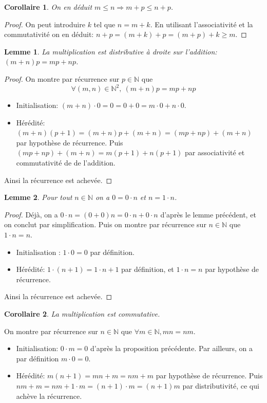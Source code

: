 \documentclass[french]{book}
\theoremstyle{plain}
\newtheorem{lem}{Lemme}[chapter]
\newtheorem{cor}{Corollaire}[chapter]
\theoremstyle{definition}
\theoremstyle{remark}
\begin{document}
\begin{cor}
	On en déduit $m \leqslant n \Rightarrow m + p \leqslant n + p$.
\end{cor}
\begin{proof}
	On peut introduire $k$ tel que $n = m + k$. En utilisant l'associativité et la commutativité on en déduit: $n + p = (m + k) + p = (m + p) + k \geqslant m$.
\end{proof}
\begin{lem}
	La multiplication est distributive à droite sur l'addition: $(m + n)p = mp + np$.
\end{lem}
\begin{proof}
	On montre par récurrence sur $p \in \mathbb{N}$ que $$\forall(m,n) \in \mathbb{N}^2,\ (m + n)p = mp + np$$
\begin{itemize}
	\item Initialisation: $(m + n) \cdot 0 = 0 = 0 + 0 = m \cdot 0 + n \cdot 0$.
	\item Hérédité: $(m + n)(p + 1) = (m + n)p + (m + n) = (mp + np) + (m + n)$ par hypothèse de récurrence. Puis $(mp + np) + (m + n) = m(p + 1) + n(p + 1)$ par associativité et commutativité de de l'addition.
\end{itemize}
Ainsi la récurrence est achevée.
\end{proof}
\begin{lem}
	Pour tout $n \in \mathbb{N}$ on a $0 = 0 \cdot n$ et $n = 1 \cdot n$.
\end{lem}
\begin{proof}
	Déjà, on a $0 \cdot n = (0 + 0)n = 0 \cdot n + 0 \cdot n$ d'après le lemme précédent, et on conclut par simplification. Puis on montre par récurrence sur $n \in \mathbb{N}$ que $1 \cdot n = n$.
\begin{itemize}
	\item Initialisation : $1 \cdot 0 = 0$ par définition.
	\item Hérédité: $1 \cdot (n + 1) = 1 \cdot n + 1$ par définition, et $1 \cdot n = n$ par hypothèse de récurrence.
\end{itemize}
Ainsi la récurrence est achevée.
\end{proof}
\begin{cor}
	La multiplication est commutative.
\end{cor}
On montre par récurrence sur $n \in \mathbb{N}$ que $\forall m \in \mathbb{N}, mn = nm$.
\begin{itemize}
	\item Initialisation: $0 \cdot m = 0$ d'après la proposition précédente. Par ailleurs, on a par définition $m \cdot 0 = 0$.
	\item Hérédité: $m(n + 1) = mn + m = nm + m$ par hypothèse de récurrence.
	Puis $nm + m = nm + 1 \cdot m = (n + 1) \cdot m = (n + 1)m$ par distributivité,
	ce qui achève la récurrence.
\end{itemize}
\end{document}
